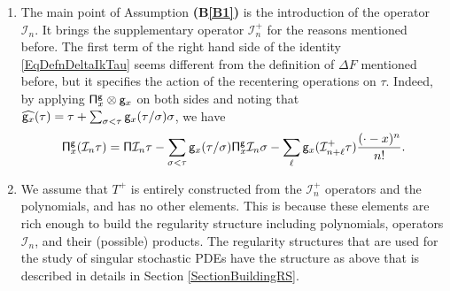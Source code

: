\documentclass[10pt, reqno]{amsart}
\numberwithin{subsection}{section}
\numberwithin{subsubsection}{subsection}
\numberwithin{equation}{section} %
\theoremstyle{mystyle}
\theoremstyle{mystyle2}
\theoremstyle{mystyle3}
\newcommand{\refB}[1]{\textbf{\textsf{(B\ref{#1})}}}
\newcommand{\mcI}{\mathcal{I}}
\begin{document}
\begin{enumerate}
	\item The main point of Assumption \refB{B1} is the introduction of the operator $\mcI_n$. It brings the supplementary operator $\mcI_n^+$ for the reasons mentioned before. The first term of the right hand side of the identity \eqref{EqDefnDeltaIkTau} seems different from the definition of $\Delta F$ mentioned before, but it specifies the action of the recentering operations on $\tau$. Indeed, by applying ${\sf\Pi}_x^{\sf g}\otimes{\sf g}_x$ on both sides and noting that $\widehat{{\sf g}_x}(\tau) = \tau+\sum_{\sigma<\tau}{\sf g}_x(\tau/\sigma)\sigma$, we have
\begin{align*}
{\sf\Pi}_x^{\sf g}(\mcI_n\tau) = {\sf\Pi}\mcI_n\tau-\sum_{\sigma<\tau}{\sf g}_x(\tau/\sigma){\sf\Pi}_x^{\sf g}\mcI_n\sigma-\sum_{\ell}{\sf g}_x(\mcI_{n+\ell}^+\tau)\frac{(\cdot-x)^n}{n!}.
\end{align*}  

	\item We assume that $T^+$ is entirely constructed from the $\mcI^+_n$ operators and the polynomials, and has no other elements. This is because these elements are rich enough to build the regularity structure including polynomials, operators $\mcI_n$, and their (possible) products. The regularity structures that are used for the study of singular stochastic PDEs have the structure as above that is described in details in Section \ref{SectionBuildingRS}.
\end{enumerate}

\smallskip
\end{document}
